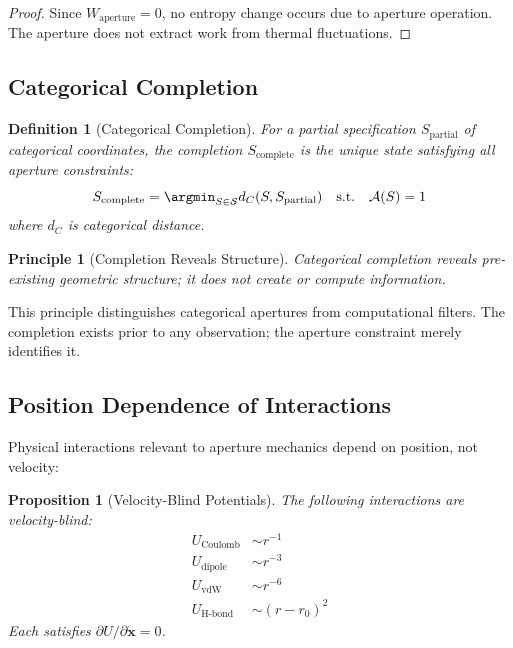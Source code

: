 \documentclass[twocolumn,amsmath,amssymb,aps,prl,superscriptaddress]{revtex4-2}
\newtheorem{proposition}[theorem]{Proposition}
\newtheorem{definition}[theorem]{Definition}
\newtheorem{principle}{Principle}
\newcommand{\Sspace}{\mathcal{S}}
\newcommand{\Apert}{\mathcal{A}}
\newcommand{\Wapert}{W_{\text{aperture}}}
\begin{document}
\begin{proof}
Since $\Wapert = 0$, no entropy change occurs due to aperture operation. The aperture does not extract work from thermal fluctuations.
\end{proof}

\subsection{Categorical Completion}

\begin{definition}[Categorical Completion]
For a partial specification $S_{\text{partial}}$ of categorical coordinates, the completion $S_{\text{complete}}$ is the unique state satisfying all aperture constraints:
\begin{equation}
S_{\text{complete}} = \argmin_{S \in \Sspace} d_C(S, S_{\text{partial}}) \quad \text{s.t.} \quad \Apert(S) = 1
\end{equation}
where $d_C$ is categorical distance.
\end{definition}

\begin{principle}[Completion Reveals Structure]
Categorical completion reveals pre-existing geometric structure; it does not create or compute information.
\end{principle}

This principle distinguishes categorical apertures from computational filters. The completion exists prior to any observation; the aperture constraint merely identifies it.

\subsection{Position Dependence of Interactions}

Physical interactions relevant to aperture mechanics depend on position, not velocity:

\begin{proposition}[Velocity-Blind Potentials]
The following interactions are velocity-blind:
\begin{align}
U_{\text{Coulomb}} &\sim r^{-1} \\
U_{\text{dipole}} &\sim r^{-3} \\
U_{\text{vdW}} &\sim r^{-6} \\
U_{\text{H-bond}} &\sim (r - r_0)^2
\end{align}
Each satisfies $\partial U / \partial \dot{\mathbf{x}} = 0$.
\end{proposition}
\end{document}
